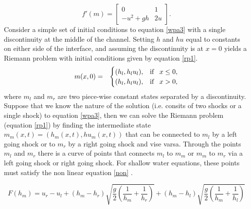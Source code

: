 \documentclass[11pt,a4paper]{article}
\begin{document}
	\begin{equation}
		f'(m) = \begin{bmatrix} 0 &  1 \\ -u^{2} + gh & 2u \end{bmatrix}.
		\label{Jac}
	\end{equation}
	Consider a   simple set of initial conditions to equation \eqref{wpa3} with a single discontinuity at the middle of the channel.  Setting  $h$ and $hu$ equal to constants on either side of the interface, and assuming the discontinuity is at $x = 0$ yields a Riemann problem with initial conditions given by equation \eqref{rp1}.
	\begin{eqnarray}
		m(x,0)& =& \begin{cases}
			(h_{l},h_{l}u_{l}), & \text{if \, $x \le 0,$}\\
			(h_{l},h_{l}u_{l}),& \text{if \, $x > 0,$}\\
			
		\end{cases}  
		\label{rp1}     
	\end{eqnarray}
	where $m_{l}$ and $m_{r}$ are two piece-wise constant states separated by a discontinuity. 
	Suppose that we know the nature of the solution (i.e. consits of two shocks or a single shock) to equation \eqref{wpa3},  then we can solve the Riemann problem (equation \eqref{rp1})  by finding the intermediate state $m_{m}(x,t) = (h_{m}(x,t), hu_{m}(x,t))$ that can be connected to $m_l$ by a left going shock or to $m_r$ by a right going shock and vise varsa. Through the points $m_l$ and $m_r$ there is a curve of points that connects $m_l$ to $m_m$ or   $m_m$ to $m_r$ via a left going shock or right going shock. For shallow water equations, these points must satisfy the non linear equation \eqref{non} \citep{leveque2002finite}.
	
	\begin{equation}
		F(h_m) = u_r - u_l + (h_m - h_r)\sqrt{\frac{g}{2}\left( \frac{1}{h_m} +  \frac{1}{h_r}\right) } + (h_m - h_l)\sqrt{\frac{g}{2}\left( \frac{1}{h_m} +  \frac{1}{h_l}\right) } 
		\label{non}
	\end{equation}
	
\end{document}
